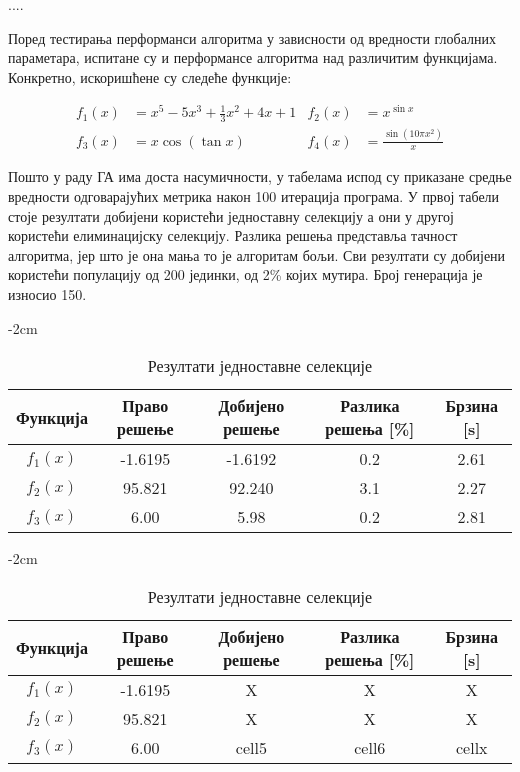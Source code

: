 \documentclass{article}
\begin{document}
....

Поред тестирања перформанси алгоритма у зависности од вредности глобалних параметара, испитане
су и перформансе алгоритма над различитим функцијама. Конкретно, искоришћене су следеће функције: 

\begin{align*}
    f_1(x) &= x^5 - 5x^3 + \frac{1}{3} x^2 + 4x + 1 & f_2(x) &= x ^ {\sin x} \\
    f_3(x) &= x \cos(\tan x) & f_4(x) &= \frac{\sin(10 \pi x^2)}{x} 
\end{align*}

Пошто у раду ГА има доста насумичности, у табелама испод су приказане средње вредности одговарајућих
метрика након 100 итерација програма. У првој табели стоје резултати добијени користећи
једноставну селекцију а они у другој користећи елиминацијску селекцију. Разлика решења представља 
тачност алгоритма, јер што је она мања то је алгоритам бољи. Сви резултати су добијени користећи 
популацију од 200 јединки, од 2\% којих мутира. Број генерација је износио 150.

\begin{table}[H]
    \centering
    \addtolength{\leftskip} {-2cm}
    \addtolength{\rightskip}{-2cm}
    \begin{tabular}{ |c|c|c|c|c| } 
        \hline
        \textbf{Функција} & \textbf{Право решење} & \textbf{Добијено решење} & \textbf{Разлика решења [\%]} & \textbf{Брзина [s]} \\ 
        \hline
        $f_1(x)$ & -1.6195 & -1.6192 & 0.2 & 2.61 \\ 
        \hline                     
        $f_2(x)$ & 95.821 & 92.240 & 3.1 & 2.27 \\ 
        \hline                     
        $f_3(x)$ & 6.00 & 5.98 & 0.2 & 2.81 \\ 
        \hline                     
    \end{tabular}
    \caption{Резултати једноставне селекције}
\end{table}

\begin{table}[H]
    \centering
    \addtolength{\leftskip} {-2cm}
    \addtolength{\rightskip}{-2cm}
    \begin{tabular}{ |c|c|c|c|c| } 
        \hline
        \textbf{Функција} & \textbf{Право решење} & \textbf{Добијено решење} & \textbf{Разлика решења [\%]} & \textbf{Брзина [s]} \\ 
        \hline
        $f_1(x)$ & -1.6195 & X & X & X \\ 
        \hline                     
        $f_2(x)$ & 95.821 & X & X & X \\ 
        \hline                     
        $f_3(x)$ & 6.00 & cell5 & cell6 & cellx \\ 
        \hline                     
    \end{tabular}
    \caption{Резултати једноставне селекције}
\end{table}
\end{document}
